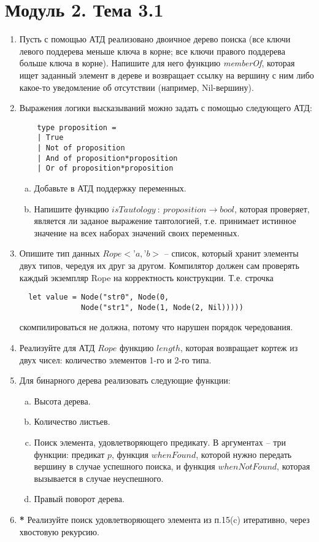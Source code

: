 \documentclass[a4paper,11pt]{article}
\begin{document}
\section*{Модуль 2. Тема 3.1}
\begin{enumerate}[{2-1}1]
\item Пусть с помощью АТД реализовано двоичное дерево поиска (все ключи левого
поддерева меньше ключа в корне; все ключи правого поддерева больше ключа
в корне). Напишите для него функцию \emph{memberOf}, которая ищет заданный
элемент в дереве и возвращает ссылку на вершину с ним либо какое-то
уведомление об отсутствии (например, Nil-вершину).

\item Выражения логики высказываний можно задать с помощью следующего АТД:
  \begin{lstlisting}
    type proposition =
    | True
    | Not of proposition
    | And of proposition*proposition
    | Or of proposition*proposition
  \end{lstlisting}
  \begin{enumerate}[(a)]
  \item Добавьте в АТД поддержку переменных.
  \item Напишите функцию $isTautology~:~proposition \rightarrow bool$, которая
    проверяет, является ли заданое выражение тавтологией, т.е. принимает
    истинное значение на всех наборах значений своих переменных.  
  \end{enumerate}

\item Опишите тип данных $Rope<’a, ’b>$ -- список, который хранит элементы 
двух типов, чередуя их друг за другом. Компилятор должен сам проверять каждый
экземпляр Rope на корректность конструкции. Т.е. строчка
\begin{lstlisting}
  let value = Node("str0", Node(0, 
              Node("str1", Node(1, Node(2, Nil)))))
\end{lstlisting}
скомпилироваться не должна, потому что нарушен порядок чередования.

\item Реализуйте для АТД $Rope$ функцию $length$, которая возвращает кортеж
из двух чисел: количество элементов 1-го и 2-го типа.

\item Для бинарного дерева реализовать следующие функции:
  \begin{enumerate}[(a)]
  \item Высота дерева.
  \item Количество листьев.
  \item Поиск элемента, удовлетворяющего предикату. В аргументах – три 
    функции: предикат $p$, функция $whenFound$, которой нужно передать вершину
    в случае успешного поиска, и функция $whenNotFound$, которая вызывается в
    случае неуспешного.
  \item Правый поворот дерева.
  \end{enumerate}

\item \textbf{*} Реализуйте поиск удовлетворяющего элемента из п.15(c) 
  итеративно, через хвостовую рекурсию.
\end{enumerate}
\end{document}
